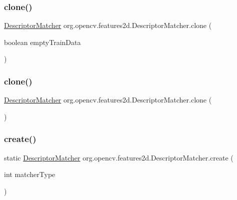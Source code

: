 \subsubsection{\texorpdfstring{clone()}{clone()}\hspace{0.1cm}{\footnotesize\ttfamily [1/2]}}
{\footnotesize\ttfamily \mbox{\hyperlink{classorg_1_1opencv_1_1features2d_1_1_descriptor_matcher}{Descriptor\+Matcher}} org.\+opencv.\+features2d.\+Descriptor\+Matcher.\+clone (\begin{DoxyParamCaption}\item[{boolean}]{empty\+Train\+Data }\end{DoxyParamCaption})}

\mbox{\label{classorg_1_1opencv_1_1features2d_1_1_descriptor_matcher_a4ff8536e8a907010eaacb98ebe996a24}} 
\subsubsection{\texorpdfstring{clone()}{clone()}\hspace{0.1cm}{\footnotesize\ttfamily [2/2]}}
{\footnotesize\ttfamily \mbox{\hyperlink{classorg_1_1opencv_1_1features2d_1_1_descriptor_matcher}{Descriptor\+Matcher}} org.\+opencv.\+features2d.\+Descriptor\+Matcher.\+clone (\begin{DoxyParamCaption}{ }\end{DoxyParamCaption})}

\mbox{\label{classorg_1_1opencv_1_1features2d_1_1_descriptor_matcher_a14964b877eda32f47ed2d37d22dba3d1}} 
\subsubsection{\texorpdfstring{create()}{create()}}
{\footnotesize\ttfamily static \mbox{\hyperlink{classorg_1_1opencv_1_1features2d_1_1_descriptor_matcher}{Descriptor\+Matcher}} org.\+opencv.\+features2d.\+Descriptor\+Matcher.\+create (\begin{DoxyParamCaption}\item[{int}]{matcher\+Type }\end{DoxyParamCaption})\hspace{0.3cm}{\ttfamily [static]}}


